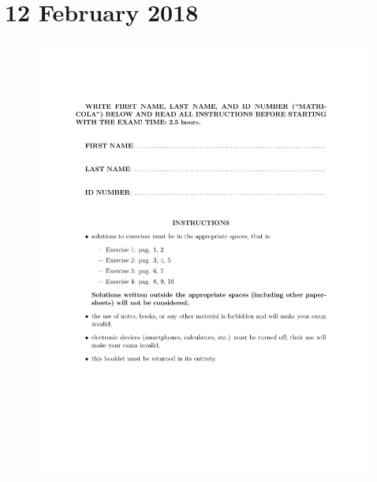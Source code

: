 \documentclass[a4paper,11pt,oneside]{book}
\begin{document}
\chapter{12 February 2018}

\begin{figure}[H]
    \centering
    \begin{minipage}{0.45\textwidth}
        \includegraphics[width=\textwidth,page=3]{images/12_Feb_2018.pdf}
    \end{minipage}
    \hfill
    \begin{minipage}{0.45\textwidth}

\end{minipage}
\end{figure}
\end{document}
